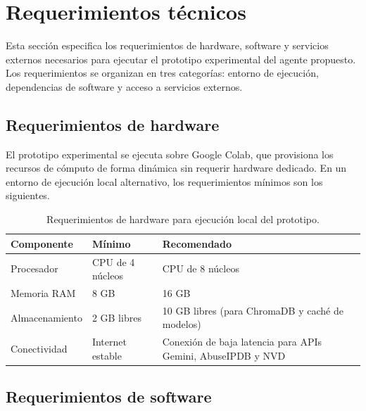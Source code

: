 \section{Requerimientos técnicos}

Esta sección especifica los requerimientos de hardware,
software y servicios externos necesarios para ejecutar el
prototipo experimental del agente propuesto. Los
requerimientos se organizan en tres categorías: entorno de
ejecución, dependencias de software y acceso a servicios
externos.

\subsection{Requerimientos de hardware}

El prototipo experimental se ejecuta sobre Google Colab, que
provisiona los recursos de cómputo de forma dinámica sin
requerir hardware dedicado. En un entorno de ejecución local
alternativo, los requerimientos mínimos son los siguientes.

\begin{table}[H]
\centering
\caption{Requerimientos de hardware para ejecución local
         del prototipo.}
\label{tab:req_hardware}
\renewcommand{\arraystretch}{1.3}
\begin{tabularx}{\textwidth}{p{3.0cm} p{3.5cm} X}
\toprule
\textbf{Componente} & \textbf{Mínimo} & \textbf{Recomendado} \\
\midrule
Procesador  & CPU de 4 núcleos & CPU de 8 núcleos \\
Memoria RAM & 8 GB             & 16 GB \\
Almacenamiento & 2 GB libres   & 10 GB libres (para ChromaDB y caché de modelos) \\
Conectividad & Internet estable & Conexión de baja latencia para APIs Gemini, AbuseIPDB y NVD \\
\bottomrule
\end{tabularx}
\end{table}


\subsection{Requerimientos de software}

